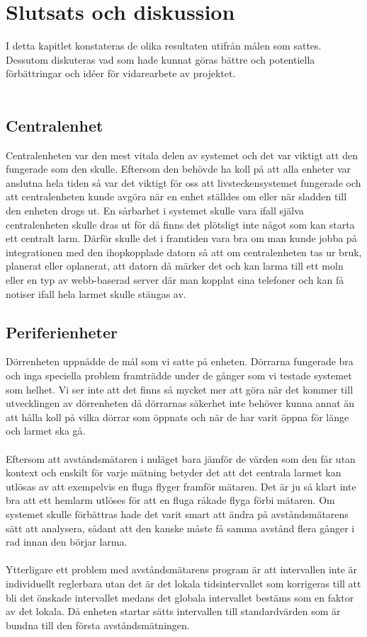 \documentclass{article}
\begin{document}
\section{Slutsats och diskussion}
I detta kapitlet konstateras de olika resultaten utifrån målen som sattes.
Dessutom diskuteras vad som hade kunnat göras bättre och potentiella förbättringar och idéer för vidarearbete av projektet.\\
\\
\subsection{Centralenhet}
Centralenheten var den mest vitala delen av systemet och det var viktigt att den fungerade som den skulle.
Eftersom den behövde ha koll på att alla enheter var anslutna hela tiden så var det viktigt för oss att livsteckensystemet fungerade och att centralenheten kunde avgöra när en enhet ställdes om eller när sladden till den enheten drogs ut.
En sårbarhet i systemet skulle vara ifall själva centralenheten skulle dras ut för då finns det plötsligt inte något som kan starta ett centralt larm. 
Därför skulle det i framtiden vara bra om man kunde jobba på integrationen med den ihopkopplade datorn så att om centralenheten tas ur bruk, planerat eller oplanerat, att datorn då märker det och kan larma till ett moln eller en typ av webb-baserad server där man kopplat sina telefoner och kan få notiser ifall hela larmet skulle stängas av.


\subsection{Periferienheter}
\noindent
Dörrenheten uppnådde de mål som vi satte på enheten. 
Dörrarna fungerade bra och inga speciella problem framträdde under de gånger som vi testade systemet som helhet. 
Vi ser inte att det finns så mycket mer att göra när det kommer till utvecklingen av dörrenheten då dörrarnas säkerhet inte behöver kunna annat än att hålla koll på vilka dörrar som öppnats och när de har varit öppna för länge och larmet ska gå.\\
\\
Eftersom att avståndsmätaren i nuläget bara jämför de värden som den får utan kontext och enskilt för varje mätning betyder det att det centrala larmet kan utlösas av att exempelvis en fluga flyger framför mätaren.
Det är ju så klart inte bra att ett hemlarm utlöses för att en fluga råkade flyga förbi mätaren.
Om systemet skulle förbättras hade det varit smart att ändra på avståndsmätarens sätt att analysera, sådant att den kanske måste få samma avstånd flera gånger i rad innan den börjar larma.\\
\\
Ytterligare ett problem med avståndsmätarens program är att intervallen inte är individuellt reglerbara utan det är det lokala tidsintervallet som korrigeras till att bli det önskade intervallet medans det globala intervallet bestäms som en faktor av det lokala. 
Då enheten startar sätts intervallen till standardvärden som är bundna till den första avståndsmätningen. 
\end{document}
